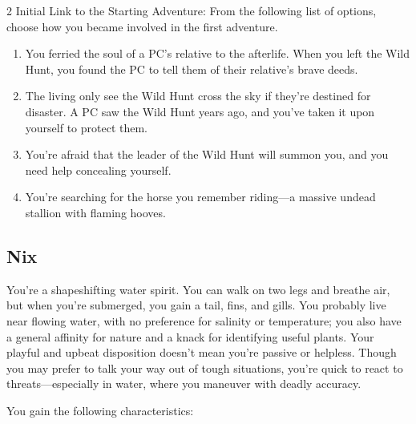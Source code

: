 \begin{multicols}{2}
Initial Link to the Starting Adventure: From the following list of options, choose how you became involved in the first adventure.
\begin{enumerate}
\item You ferried the soul of a PC’s relative to the afterlife. When you left the Wild Hunt, you found the PC to tell them of their relative’s brave deeds.
\item The living only see the Wild Hunt cross the sky if they’re destined for disaster. A PC saw the Wild Hunt years ago, and you’ve taken it upon yourself to protect them.
\item You’re afraid that the leader of the Wild Hunt will summon you, and you need help concealing yourself.
\item You’re searching for the horse you remember riding—a massive undead stallion with flaming hooves.
\end{enumerate}

\subsection{Nix}

You’re a shapeshifting water spirit. You can walk on two legs and breathe air, but when you’re submerged, you gain a tail, fins, and gills. You probably live near flowing water, with no preference for salinity or temperature; you also have a general affinity for nature and a knack for identifying useful plants. Your playful and upbeat disposition doesn’t mean you’re passive or helpless. Though you may prefer to talk your way out of tough situations, you’re quick to react to threats—especially in water, where you maneuver with deadly accuracy.

You gain the following characteristics:


\end{multicols}
